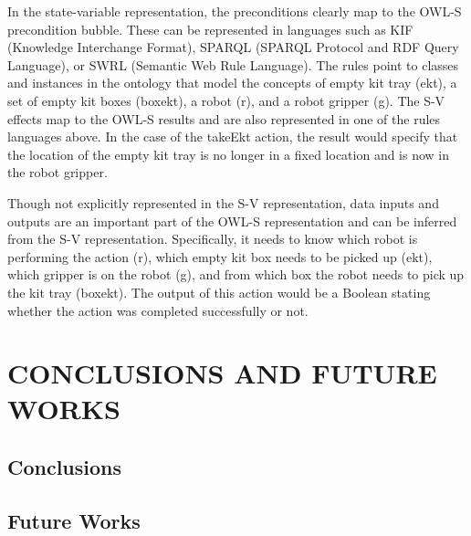 \documentclass[a4paper, 10pt, conference]{ieeeconf}      %
\begin{document}
In the state-variable representation, the preconditions clearly map to the OWL-S precondition bubble. These can be represented in languages such as KIF (Knowledge Interchange Format), SPARQL (SPARQL Protocol and RDF Query Language), or SWRL (Semantic Web Rule Language). The rules point to classes and instances in the ontology that model the concepts of empty kit tray (ekt), a set of empty kit boxes (boxekt), a robot (r), and a robot gripper (g). The S-V effects map to the OWL-S results and are also represented in one of the rules languages above. In the case of the takeEkt action, the result would specify that the location of the empty kit tray is no longer in a fixed location and is now in the robot gripper.

Though not explicitly represented in the S-V representation, data inputs and outputs are an important part of the OWL-S representation and can be inferred from the S-V representation. Specifically, it needs to know which robot is performing the action (r), which empty kit box needs to be picked up (ekt), which gripper is on the robot (g), and from which box the robot needs to pick up the kit tray (boxekt). The output of this action would be a Boolean stating whether the action was completed successfully or not.


\section{CONCLUSIONS AND FUTURE WORKS}
\label{sect:Conclusions}

\subsection{Conclusions}




\subsection{Future Works}



\end{document}
